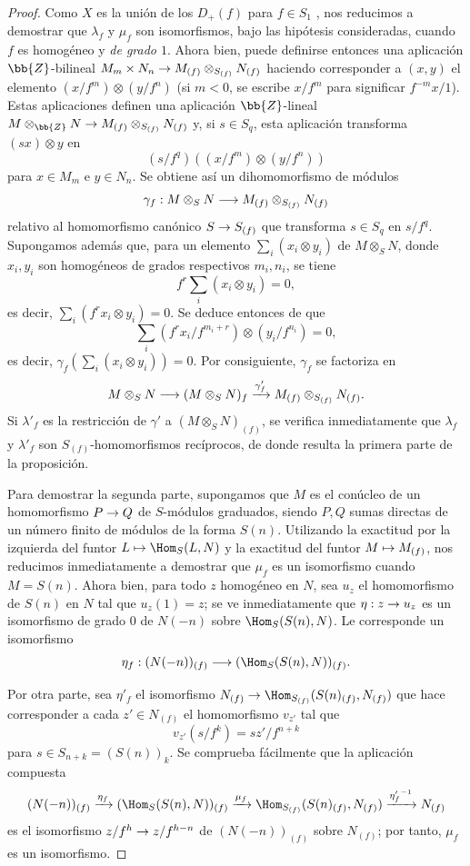 \documentclass[oneside,10pt]{amsart}
\makeatletter
\newcommand{\ega@arrow}[2]{\mathchoice{#1}{#2}{#2}{#2}}
\let\ega@shortmapsto\mapsto
\renewcommand{\to}{\ega@arrow{\longrightarrow}{\rightarrow}}
\renewcommand{\mapsto}{\ega@arrow{\longmapsto}{\ega@shortmapsto}}
\newcommand{\oldpage}[2][]{\marginnote{\normalfont\footnotesize\textbf{#1}~|~#2}\ignorespaces}
\makeatother
\begin{document}
\begin{proof}
Como $X$ es la unión de los $D_+(f)$ para $f\in S_1$ , nos reducimos a demostrar que $\lambda_f$ y $\mu_f$ son isomorfismos, bajo las hipótesis consideradas, cuando $f$ es homogéneo y \emph{de grado $1$}.
Ahora bien, puede definirse entonces una aplicación $\bb{Z}$-bilineal $M_m\times N_n\to M_{(f)}\otimes_{S_{(f)}}N_{(f)}$ haciendo corresponder a $(x,y)$ el elemento $(x/f^m)\otimes(y/f^n)$ (si $m<0$, se escribe $x/f^m$ para significar $f^{-m}x/1$).
Estas aplicaciones definen una aplicación $\bb{Z}$-lineal $M\otimes_\bb{Z}N\to M_{(f)}\otimes_{S_{(f)}}N_{(f)}$ y, si $s\in S_q$, esta aplicación transforma $(sx)\otimes y$ en
\[
  (s/f^q)((x/f^m)\otimes(y/f^n))
\]
para $x\in M_m$ e $y\in N_n$.
Se obtiene así un dihomomorfismo de módulos
\[
  \gamma_f:M\otimes_S N\to M_{(f)}\otimes_{S_{(f)}}N_{(f)}
\]
relativo al homomorfismo canónico $S\to S_{(f)}$ que transforma $s\in S_q$ en $s/f^q$.
Supongamos además que, para un elemento $\sum_i(x_i\otimes y_i)$ de $M\otimes_S N$, donde $x_i,y_i$ son homogéneos de grados respectivos $m_i,n_i$, se tiene
\[
  f^r\sum_i(x_i\otimes y_i)=0,
\]
es decir, $\sum_i(f^rx_i\otimes y_i)=0$.
Se deduce entonces de  que
\[
  \sum_i(f^rx_i/f^{m_i+r})\otimes(y_i/f^{n_i})=0,
\]
es decir, $\gamma_f(\sum_i(x_i\otimes y_i))=0$.
Por consiguiente, $\gamma_f$ se factoriza en
\[
  M\otimes_S N\to(M\otimes_S N)_f
  \xrightarrow{\gamma'_f}M_{(f)}\otimes_{S_{(f)}}N_{(f)}.
\]
Si $\lambda'_f$ es la restricción de $\gamma'$
\oldpage[II]{35}
a $(M\otimes_S N)_{(f)}$, se verifica inmediatamente que $\lambda_f$ y $\lambda'_f$ son $S_{(f)}$-homomorfismos recíprocos, de donde resulta la primera parte de la proposición.

Para demostrar la segunda parte, supongamos que $M$ es el conúcleo de un homomorfismo $P\to Q$ de $S$-módulos graduados, siendo $P,Q$ sumas directas de un número finito de módulos de la forma $S(n)$.
Utilizando la exactitud por la izquierda del funtor $L\mapsto\Hom_S(L,N)$ y la exactitud del funtor $M\mapsto M_{(f)}$, nos reducimos inmediatamente a demostrar que $\mu_f$ es un isomorfismo cuando $M=S(n)$.
Ahora bien, para todo $z$ homogéneo en $N$, sea $u_z$ el homomorfismo de $S(n)$ en $N$ tal que $u_z(1)=z$; se ve inmediatamente que $\eta:z\to u_z$ es un isomorfismo de grado $0$ de $N(-n)$ sobre $\Hom_S(S(n),N)$.
Le corresponde un isomorfismo
\[
  \eta_f:(N(-n))_{(f)}\to(\Hom_S(S(n),N))_{(f)}.
\]

Por otra parte, sea $\eta'_f$ el isomorfismo $N_{(f)}\to\Hom_{S_{(f)}}(S(n)_{(f)},N_{(f)})$ que hace corresponder a cada $z'\in N_{(f)}$ el homomorfismo $v_{z'}$ tal que
\[
  v_{z'}(s/f^k)=sz'/f^{n+k}
\]
para $s\in S_{n+k}=(S(n))_k$.
Se comprueba fácilmente que la aplicación compuesta
\[
  (N(-n))_{(f)}
  \xrightarrow{\eta_f}(\Hom_S(S(n),N))_{(f)}
  \xrightarrow{\mu_f}\Hom_{S_{(f)}}(S(n)_{(f)},N_{(f)})
  \xrightarrow{{\eta'_f}^{-1}}N_{(f)}
\]
es el isomorfismo $z/f^h\to z/f^{h-n}$ de $(N(-n))_{(f)}$ sobre $N_{(f)}$; por tanto, $\mu_f$ es un isomorfismo.
\end{proof}
\end{document}
